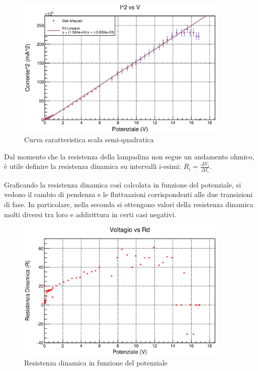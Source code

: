 \documentclass[a4paper]{article}
\begin{document}
\begin{figure}[!htbp]
  \centering
      \includegraphics[width=0.9\textwidth]{immagini/I2vsV.eps}
        \caption{Curva caratteristica scala semi-quadratica}
\end{figure}
\FloatBarrier

Dal momento che la resistenza della lampadina non segue un andamento ohmico, è utile definire la resistenza dinamica su intervalli i-esimi: $R_{i} = \frac{\Delta V_i}{\Delta I_i}$. 

Graficando la resistenza dinamica così calcolata in funzione del potenziale, si vedono il cambio di pendenza e le fluttuazioni corrispondenti alle due transizioni di fase. In particolare, nella seconda si ottengono valori della resistenza dinamica molti diversi tra loro e addirittura in certi casi negativi. 

\begin{figure}[!htbp]
  \centering
      \includegraphics[width=0.9\textwidth]{immagini/fotodiodord.eps}
        \caption{Resistenza dinamica in funzione del potenziale}
\end{figure}
\FloatBarrier
\end{document}

